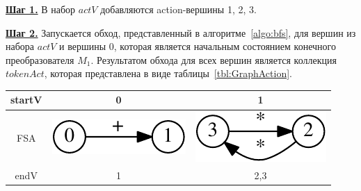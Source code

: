 \documentclass[10pt, conference, compsocconf]{IEEEtran}
\begin{document}
\textbf{\underline{Шаг 1.}} В набор $actV$ добавляются action-вершины  1, 2, 3.

\textbf{\underline{Шаг 2.}} Запускается обход, представленный в алгоритме~\ref{algo:bfs}, для вершин из набора  $actV$ и вершины 0, которая является начальным состоянием конечного преобразователя $M_1$. Результатом обхода для всех вершин является коллекция $tokenAct$, которая представлена в виде таблицы~\ref{tbl:GraphAction}. 

\begin{table}[h]
  \centering
  \begin{tabular}{ | c | c | c | }
    \hline
    startV & 0 & 1 \\ \hline
    FSA
    &
    \begin{minipage}{.15\textwidth}
    \vspace{1 mm} 
      \includegraphics[width=\linewidth]{pics/0_tok}
    \end{minipage}
    &
    \begin{minipage}{.15\textwidth}
    \vspace{1 mm} 
      \includegraphics[width=\linewidth]{pics/24_tok}
    \end{minipage}
    \\ \hline
    endV & 1 & 2,3 \\ \hline
  \end{tabular}
  

\end{table}
\end{document}
